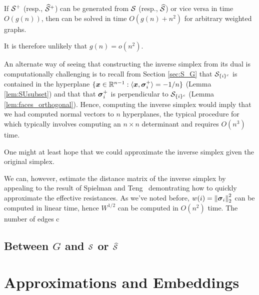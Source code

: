\begin{lemma}
	If $\mathcal{S}^+$  (resp., $\widehat{\mathcal{S}}^+$) can be generated from $\mathcal{S}$ (resp., $\widehat{\mathcal{S}}$) or vice versa in time $O(g(n))$, then \lapdecomp can be solved in time $O(g(n) + n^2)$ for arbitrary weighted graphs. 
\end{lemma}

It is therefore unlikely that $g(n) = o(n^2)$. 

An alternate way of seeing that constructing the inverse simplex from its dual is computationally challenging is to recall from Section \ref{sec:S_G} that $\mathcal{S}_{\{i\}^c}$ is contained in the hyperplane $\{\vb*{x}\in\mathbb{R}^{n-1}:\langle \vb*{x},\vb*{\sigma}_i^+\rangle = -1/n\}$ (Lemma \ref{lem:SUsubset})
 and that that $\vb*{\sigma}_i^+$ is perpendicular to $\mathcal{S}_{\{i\}^c}$ (Lemma \ref{lem:faces_orthogonal}). Hence, computing the inverse simplex would imply that we had computed normal vectors to $n$ hyperplanes, the typical procedure for which typically involves computing an $n\times n$ determinant and requires  $O(n^3)$ time. 
 
 One might at least hope that we could approximate the inverse simplex given the original simplex. 












We can, however, estimate the distance matrix of the inverse simplex by appealing to the result of Spielman and Teng~\cite{spielman2011graph} demontrating how to quickly approximate the effective resistances. As we've noted before, $w(i) = \norm{\vb*{\sigma}_i}_2^2$ can be computed in linear time, hence $W^{1/2}$ can be computed in $O(n^2)$ time. The number of edges c








\subsection{Between \texorpdfstring{$G$}{the graph} and \texorpdfstring{$\mathcal{S}$ or $\widehat{\mathcal{S}}$}{its simplices}}



\section{Approximations and Embeddings} 

